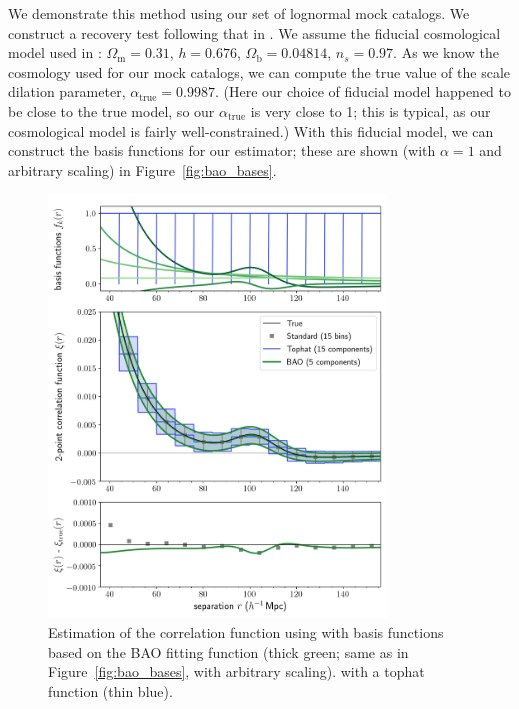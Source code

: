 We demonstrate this method using our set of lognormal mock catalogs.
We construct a recovery test following that in \cite{Hinton2019}.
We assume the fiducial cosmological model used in \cite{Beutler2017}: $\Omega_{\text{m}} = 0.31$, $h = 0.676$, $\Omega_{\text{b}} = 0.04814$, $n_s = 0.97$. 
As we know the cosmology used for our mock catalogs, we can compute the true value of the scale dilation parameter, $\alpha_{\text{true}}=0.9987$.
(Here our choice of fiducial model happened to be close to the true model, so our $\alpha_{\text{true}}$ is very close to 1; this is typical, as our cosmological model is fairly well-constrained.)
With this fiducial model, we can construct the basis functions for our estimator; these are shown (with $\alpha=1$ and arbitrary scaling) in Figure~\ref{fig:bao_bases}.

\begin{figure}[t]
\centering
    \includegraphics[width=0.8\textwidth]{xicomparison_2e-4_tophat8_baoiter}
    \caption{Estimation of the correlation function using \est with basis functions based on the BAO fitting function (thick green; same as in Figure~\ref{fig:bao_bases}, with arbitrary scaling).  \est with a tophat function (thin blue). }
    \label{fig:bao}
\end{figure}

